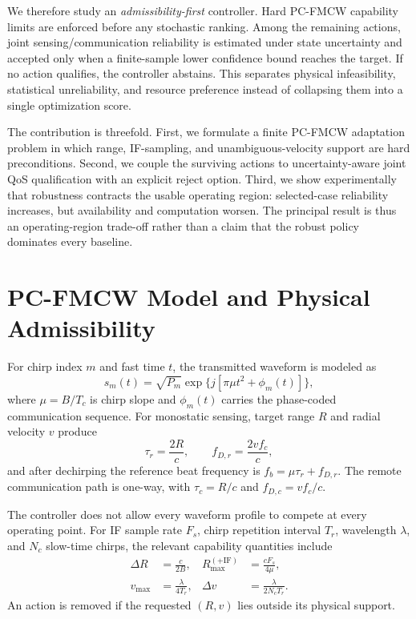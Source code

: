\documentclass[conference,a4paper]{IEEEtran}
\begin{document}
We therefore study an \emph{admissibility-first} controller. Hard PC-FMCW capability limits are enforced before any stochastic ranking. Among the remaining actions, joint sensing/communication reliability is estimated under state uncertainty and accepted only when a finite-sample lower confidence bound reaches the target. If no action qualifies, the controller abstains. This separates physical infeasibility, statistical unreliability, and resource preference instead of collapsing them into a single optimization score.

\radarconfArchitecture

The contribution is threefold. First, we formulate a finite PC-FMCW adaptation problem in which range, IF-sampling, and unambiguous-velocity support are hard preconditions. Second, we couple the surviving actions to uncertainty-aware joint QoS qualification with an explicit reject option. Third, we show experimentally that robustness contracts the usable operating region: selected-case reliability increases, but availability and computation worsen. The principal result is thus an operating-region trade-off rather than a claim that the robust policy dominates every baseline.

\section{PC-FMCW Model and Physical Admissibility}

For chirp index $m$ and fast time $t$, the transmitted waveform is modeled as
\begin{equation}
s_m(t)=\sqrt{P_m}\exp\{j[\pi\mu t^2+\phi_m(t)]\},
\end{equation}
where $\mu=B/T_c$ is chirp slope and $\phi_m(t)$ carries the phase-coded communication sequence. For monostatic sensing, target range $R$ and radial velocity $v$ produce
\begin{equation}
\tau_r=\frac{2R}{c},\qquad f_{D,r}=\frac{2vf_c}{c},
\end{equation}
and after dechirping the reference beat frequency is $f_b=\mu\tau_r+f_{D,r}$. The remote communication path is one-way, with $\tau_c=R/c$ and $f_{D,c}=vf_c/c$.

The controller does not allow every waveform profile to compete at every operating point. For IF sample rate $F_s$, chirp repetition interval $T_r$, wavelength $\lambda$, and $N_c$ slow-time chirps, the relevant capability quantities include
\begin{align}
\Delta R &= \frac{c}{2B}, &
R_{\max}^{(+\mathrm{IF})} &= \frac{cF_s}{4\mu},\\
v_{\max} &= \frac{\lambda}{4T_r}, &
\Delta v &= \frac{\lambda}{2N_cT_r}.
\end{align}
An action is removed if the requested $(R,v)$ lies outside its physical support.
\end{document}
